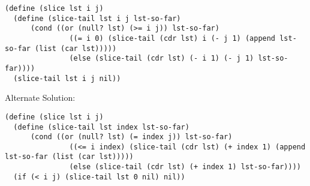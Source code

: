 \begin{parts}

\begin{blocksection}
\begin{solution}
\begin{lstlisting}
(define (slice lst i j)
  (define (slice-tail lst i j lst-so-far)
      (cond ((or (null? lst) (>= i j)) lst-so-far)
               ((= i 0) (slice-tail (cdr lst) i (- j 1) (append lst-so-far (list (car lst)))))
               (else (slice-tail (cdr lst) (- i 1) (- j 1) lst-so-far))))
  (slice-tail lst i j nil))
\end{lstlisting}
Alternate Solution:
\begin{lstlisting}
(define (slice lst i j)
  (define (slice-tail lst index lst-so-far)
      (cond ((or (null? lst) (= index j)) lst-so-far)
               ((<= i index) (slice-tail (cdr lst) (+ index 1) (append lst-so-far (list (car lst)))))
               (else (slice-tail (cdr lst) (+ index 1) lst-so-far))))
  (if (< i j) (slice-tail lst 0 nil) nil))
\end{lstlisting}
\end{solution}

\end{blocksection}
\end{parts}

